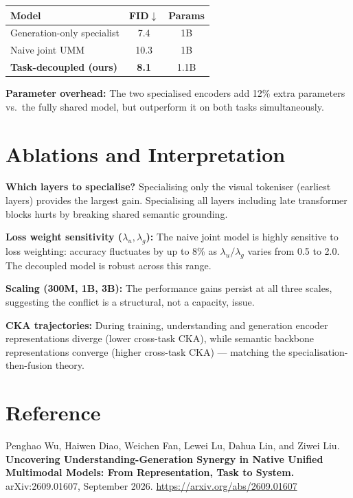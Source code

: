\documentclass[10pt,twocolumn]{article}
\begin{document}
\begin{center}
\begin{tabular}{lcc}
\toprule
Model & FID$\downarrow$ & Params \\
\midrule
Generation-only specialist & 7.4 & 1B \\
Naive joint UMM & 10.3 & 1B \\
\textbf{Task-decoupled (ours)} & \textbf{8.1} & 1.1B \\
\bottomrule
\end{tabular}
\end{center}

\textbf{Parameter overhead:} The two specialised encoders add 12\%
extra parameters vs.\ the fully shared model, but outperform it on both
tasks simultaneously.

\section{Ablations and Interpretation}

\textbf{Which layers to specialise?} Specialising only the visual
tokeniser (earliest layers) provides the largest gain. Specialising
all layers including late transformer blocks hurts by breaking shared
semantic grounding.

\textbf{Loss weight sensitivity ($\lambda_u, \lambda_g$):} The naive
joint model is highly sensitive to loss weighting: accuracy fluctuates
by up to 8\% as $\lambda_u / \lambda_g$ varies from 0.5 to 2.0.
The decoupled model is robust across this range.

\textbf{Scaling (300M, 1B, 3B):} The performance gains persist at all
three scales, suggesting the conflict is a structural, not a capacity,
issue.

\textbf{CKA trajectories:} During training, understanding and generation
encoder representations diverge (lower cross-task CKA), while semantic
backbone representations converge (higher cross-task CKA) --- matching
the specialisation-then-fusion theory.

\section*{Reference}

Penghao Wu, Haiwen Diao, Weichen Fan, Lewei Lu, Dahua Lin, and Ziwei Liu.
\textbf{Uncovering Understanding-Generation Synergy in Native Unified
Multimodal Models: From Representation, Task to System.}
arXiv:2609.01607, September 2026.
\url{https://arxiv.org/abs/2609.01607}
\end{document}
